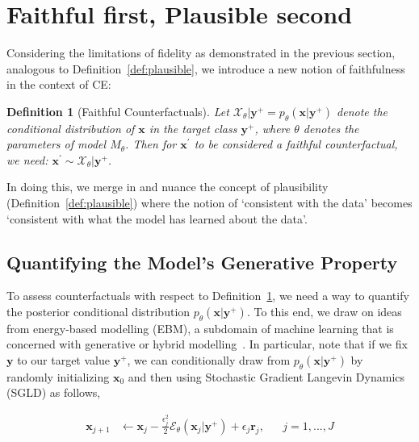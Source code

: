 \documentclass[letterpaper]{article} %
\newtheorem{definition}{Definition}[section]
\begin{document}
\section{Faithful first, Plausible second}\label{faithfulness}

Considering the limitations of fidelity as demonstrated in the previous section, analogous to Definition~\ref{def:plausible}, we introduce a new notion of faithfulness in the context of CE:

\begin{definition}[Faithful Counterfactuals]
  \label{def:faithful}
  Let $\mathcal{X}_{\theta}|\mathbf{y}^+ = p_{\theta}(\mathbf{x}|\mathbf{y}^+)$ denote the conditional distribution of $\mathbf{x}$ in the target class $\mathbf{y}^+$, where $\theta$ denotes the parameters of model $M_{\theta}$. Then for $\mathbf{x}^{\prime}$ to be considered a faithful counterfactual, we need: $\mathbf{x}^{\prime} \sim \mathcal{X}_{\theta}|\mathbf{y}^+$.
\end{definition}

In doing this, we merge in and nuance the concept of plausibility (Definition~\ref{def:plausible}) where the notion of `consistent with the data' becomes `consistent with what the model has learned about the data'.

\subsection{Quantifying the Model's Generative Property}

To assess counterfactuals with respect to Definition~\ref{def:faithful}, we need a way to quantify the posterior conditional distribution $p_{\theta}(\mathbf{x}|\mathbf{y}^+)$. To this end, we draw on ideas from energy-based modelling (EBM), a subdomain of machine learning that is concerned with generative or hybrid modelling~\citep{grathwohl2020your,du2019implicit}. In particular, note that if we fix $\mathbf{y}$ to our target value $\mathbf{y}^+$, we can conditionally draw from $p_{\theta}(\mathbf{x}|\mathbf{y}^+)$ by randomly initializing $\mathbf{x}_0$ and then using Stochastic Gradient Langevin Dynamics (SGLD) as follows, 

\begin{equation}\label{eq:sgld}
  \begin{aligned}
    \mathbf{x}_{j+1} &\leftarrow \mathbf{x}_j - \frac{\epsilon_j^2}{2} \mathcal{E}_{\theta}(\mathbf{x}_j|\mathbf{y}^+) + \epsilon_j \mathbf{r}_j, && j=1,...,J
  \end{aligned}
\end{equation}
\end{document}
